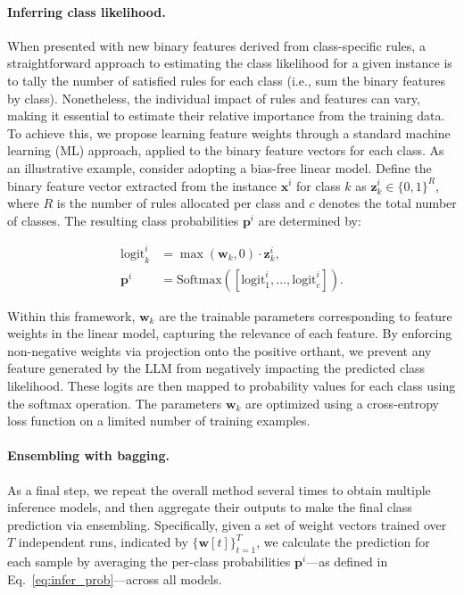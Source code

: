 \paragraph{Inferring class likelihood.} When presented with new binary features derived from class-specific rules, a straightforward approach to estimating the class likelihood for a given instance is to tally the number of satisfied rules for each class (i.e., sum the binary features by class). Nonetheless, the individual impact of rules and features can vary, making it essential to estimate their relative importance from the training data. To achieve this, we propose learning feature weights through a standard machine learning (ML) approach, applied to the binary feature vectors for each class. As an illustrative example, consider adopting a bias-free linear model. Define the binary feature vector extracted from the instance $\mathbf{x}^i$ for class $k$ as $\mathbf{z}_k^i \in \{0, 1\}^R$, where $R$ is the number of rules allocated per class and $c$ denotes the total number of classes. The resulting class probabilities $\mathbf{p}^i$ are determined by:

\begin{align}
\text{logit}_k^i &= \max(\mathbf{w}_k, 0) \cdot \mathbf{z}_k^i, \nonumber \\
\mathbf{p}^i &= \text{Softmax}({[\text{logit}_{1}^i, ..., \text{logit}_{c}^i]}). \label{eq:infer_prob}
\end{align}

Within this framework, $\mathbf{w}_k$ are the trainable parameters corresponding to feature weights in the linear model, capturing the relevance of each feature. By enforcing non-negative weights via projection onto the positive orthant, we prevent any feature generated by the LLM from negatively impacting the predicted class likelihood. These logits are then mapped to probability values for each class using the softmax operation. The parameters $\mathbf{w}_k$ are optimized using a cross-entropy loss function on a limited number of training examples.

\vspace*{-0.12in}
\paragraph{Ensembling with bagging.} As a final step, we repeat the overall method several times to obtain multiple inference models, and then aggregate their outputs to make the final class prediction via ensembling. Specifically, given a set of weight vectors trained over $T$ independent runs, indicated by $\{\mathbf{w}[t]\}_{t=1}^T$, we calculate the prediction for each sample by averaging the per-class probabilities $\mathbf{p}^i$—as defined in Eq.~\ref{eq:infer_prob}—across all models.

